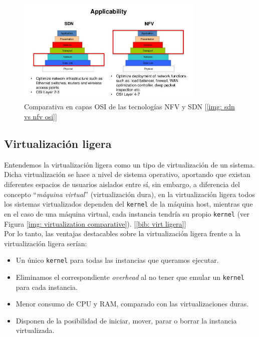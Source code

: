 \documentclass[12pt]{article}
\begin{document}
	\begin{figure}[h!]
		\begin{center}
			\includegraphics[width=0.8\textwidth]{img/sdn-y-nfv.jpg}
			\caption{Comparativa en capas OSI de las tecnologías NFV y SDN [\ref{img: sdn vs nfv osi}] }
			\label{img: sdn + nfv}
		\end{center}
	\end{figure}

	\pagebreak
	
	\subsection{Virtualización ligera}
	\label{sect: virt ligera}
	
	\noindent Entendemos la virtualización ligera como un tipo de virtualización de un sistema. Dicha virtualización se hace a nivel de sistema operativo, aportando que existan diferentes espacios de usuarios aislados entre sí, sin embargo, a diferencia del concepto ``\textit{máquina virtual}'' (virtualización dura), en la virtualización ligera todos los sistemas virtualizados dependen del \texttt{kernel} de la máquina host, mientras que en el caso de una máquina virtual, cada instancia tendría su propio \texttt{kernel} (ver Figura \ref{img: virtualization comparative}). [\ref{bib: virt ligera}]\\
	
	\noindent Por lo tanto, las ventajas destacables sobre la virtualización ligera frente a la virtualización ligera serían:
	\begin{itemize}
		\item Un único \texttt{kernel} para todas las instancias que queramos ejecutar.
		\item Eliminamos el correspondiente \textit{overhead} al no tener que emular un \texttt{kernel} para cada instancia.
		\item Menor consumo de CPU y RAM, comparado con las virtualizaciones duras.
		\item Disponen de la posibilidad de iniciar, mover, parar o borrar la instancia virtualizada.
	\end{itemize}
	
\end{document}
